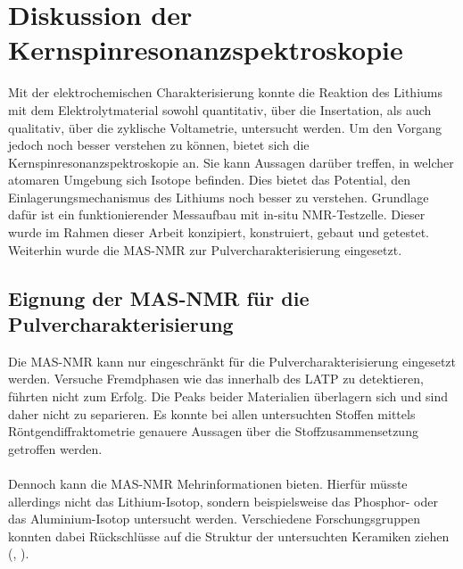 \documentclass[a4paper, 11pt, headsepline,footsepline,twoside,abstract]{scrbook}
\begin{document}
\section{Diskussion der Kernspinresonanzspektroskopie}
Mit der elektrochemischen Charakterisierung konnte die Reaktion des Lithiums mit dem Elektrolytmaterial sowohl quantitativ, über die Insertation, als auch qualitativ, über die zyklische Voltametrie, untersucht werden. Um den Vorgang jedoch noch besser verstehen zu können, bietet sich die Kernspinresonanzspektroskopie an. Sie kann Aussagen darüber treffen, in welcher atomaren Umgebung sich Isotope befinden. Dies bietet das Potential, den Einlagerungsmechanismus des Lithiums noch besser zu verstehen. Grundlage dafür ist ein funktionierender Messaufbau mit in-situ NMR-Testzelle. Dieser wurde im Rahmen dieser Arbeit konzipiert, konstruiert, gebaut und getestet. Weiterhin wurde die MAS-NMR zur Pulvercharakterisierung eingesetzt.  
\subsection{Eignung der MAS-NMR für die Pulvercharakterisierung}
Die MAS-NMR kann nur eingeschränkt für die Pulvercharakterisierung eingesetzt werden. Versuche Fremdphasen wie das  innerhalb des LATP zu detektieren, führten nicht zum Erfolg. Die Peaks beider Materialien überlagern sich und sind daher nicht zu separieren. Es konnte bei allen untersuchten Stoffen mittels Röntgendiffraktometrie genauere Aussagen über die Stoffzusammensetzung getroffen werden.
\\\\
Dennoch kann die MAS-NMR Mehrinformationen bieten. Hierfür müsste allerdings nicht das Lithium-Isotop, sondern beispielsweise das Phosphor- oder das Aluminium-Isotop untersucht werden. Verschiedene Forschungsgruppen konnten dabei Rückschlüsse auf die Struktur der untersuchten Keramiken ziehen (\cite{moreno2002glasses}, \cite{key2012solution}).
\end{document}
